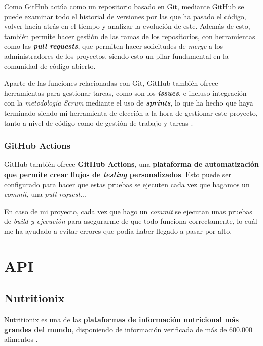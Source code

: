 
Como GitHub actúa como un repositorio basado en Git, mediante GitHub se puede examinar todo el historial de versiones por las que ha pasado el código, volver hacia atrás en el tiempo y analizar la evolución de este. Además de esto, también permite hacer gestión de las ramas de los repositorios, con herramientas como las \textit{\textbf{pull requests}}, que permiten hacer solicitudes de \textit{merge} a los administradores de los proyectos, siendo esto un pilar fundamental en la comunidad de código abierto.

Aparte de las funciones relacionadas con Git, GitHub también ofrece herramientas para gestionar tareas, como son los \textit{\textbf{issues}}, e incluso integración con la \textit{metodología Scrum} mediante el uso de \textit{\textbf{sprints}}, lo que ha hecho que haya terminado siendo mi herramienta de elección a la hora de gestionar este proyecto, tanto a nivel de código como de gestión de trabajo y tareas \cite{wikipedia:github}.

\subsubsection{GitHub Actions}

GitHub también ofrece \textbf{GitHub Actions}, una \textbf{plataforma de automatización que permite crear flujos de \textit{testing} personalizados}. Esto puede ser configurado para hacer que estas pruebas se ejecuten cada vez que hagamos un \textit{commit}, una \textit{pull request}... \cite{github-actions:docs}

En caso de mi proyecto, cada vez que hago un \textit{commit} se ejecutan unas pruebas de \textit{build y ejecución} para asegurarme de que todo funciona correctamente, lo cuál me ha ayudado a evitar errores que podía haber llegado a pasar por alto.


\section{API}

\subsection{Nutritionix}

Nutritionix es una de las \textbf{plataformas de información nutricional más grandes del mundo}, disponiendo de información verificada de más de 600.000 alimentos \cite{nutritionix:main}.

